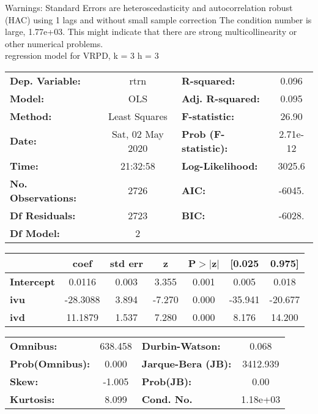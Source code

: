 Warnings: \newline
 [1] Standard Errors are heteroscedasticity and autocorrelation robust (HAC) using 1 lags and without small sample correction \newline
 [2] The condition number is large, 1.77e+03. This might indicate that there are \newline
 strong multicollinearity or other numerical problems.\\ 

regression model for VRPD, k = 3 h = 3\begin{center}
\begin{tabular}{lclc}
\toprule
\textbf{Dep. Variable:}    &       rtrn       & \textbf{  R-squared:         } &     0.096   \\
\textbf{Model:}            &       OLS        & \textbf{  Adj. R-squared:    } &     0.095   \\
\textbf{Method:}           &  Least Squares   & \textbf{  F-statistic:       } &     26.90   \\
\textbf{Date:}             & Sat, 02 May 2020 & \textbf{  Prob (F-statistic):} &  2.71e-12   \\
\textbf{Time:}             &     21:32:58     & \textbf{  Log-Likelihood:    } &    3025.6   \\
\textbf{No. Observations:} &        2726      & \textbf{  AIC:               } &    -6045.   \\
\textbf{Df Residuals:}     &        2723      & \textbf{  BIC:               } &    -6028.   \\
\textbf{Df Model:}         &           2      & \textbf{                     } &             \\
\bottomrule
\end{tabular}
\begin{tabular}{lcccccc}
                   & \textbf{coef} & \textbf{std err} & \textbf{z} & \textbf{P$> |$z$|$} & \textbf{[0.025} & \textbf{0.975]}  \\
\midrule
\textbf{Intercept} &       0.0116  &        0.003     &     3.355  &         0.001        &        0.005    &        0.018     \\
\textbf{ivu}       &     -28.3088  &        3.894     &    -7.270  &         0.000        &      -35.941    &      -20.677     \\
\textbf{ivd}       &      11.1879  &        1.537     &     7.280  &         0.000        &        8.176    &       14.200     \\
\bottomrule
\end{tabular}
\begin{tabular}{lclc}
\textbf{Omnibus:}       & 638.458 & \textbf{  Durbin-Watson:     } &    0.068  \\
\textbf{Prob(Omnibus):} &   0.000 & \textbf{  Jarque-Bera (JB):  } & 3412.939  \\
\textbf{Skew:}          &  -1.005 & \textbf{  Prob(JB):          } &     0.00  \\
\textbf{Kurtosis:}      &   8.099 & \textbf{  Cond. No.          } & 1.18e+03  \\
\bottomrule
\end{tabular}
\end{center}

